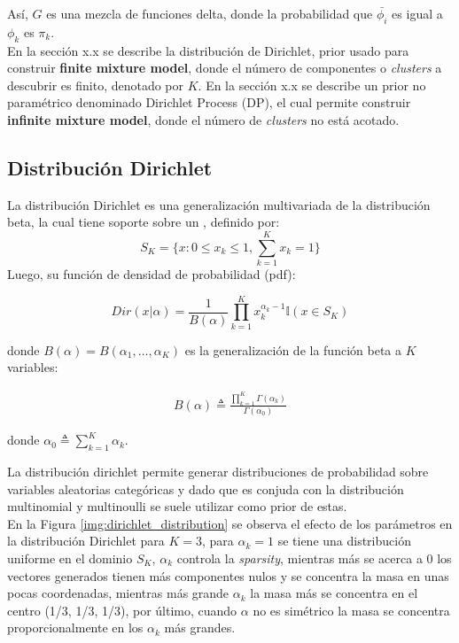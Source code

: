 \documentclass[letterpaper,12pt,oneside]{book} %
\begin{document}
Así, $G$ es una mezcla de funciones delta, donde la probabilidad que $\bar{\phi_{i}}$ es igual a $\phi_{k}$ es $\pi_{k}$.\\

En la sección x.x se describe la distribución de Dirichlet, prior usado para construir \textbf{finite mixture model}, donde el número de componentes o \textit{clusters} a descubrir es finito, denotado por $K$. En la sección x.x se describe un prior no paramétrico denominado Dirichlet Process (DP), el cual permite construir \textbf{infinite mixture model}, donde el número de \textit{clusters} no está acotado. 


\subsection{Distribución Dirichlet}
La distribución Dirichlet es una generalización multivariada de la distribución beta, la cual tiene soporte sobre un , definido por:
\begin{equation}
    S_{K} = \{x: 0\leq x_{k} \leq 1, \sum_{k=1}^{K}x_{k}=1\}
\end{equation}
Luego, su función de densidad de probabilidad (pdf):

\begin{equation}
    Dir(x|\alpha)=\frac{1}{B(\alpha)}\prod_{k=1}^{K}x_{k}^{\alpha_{k}-1}\mathbb{I}(x\in S_{K})
\end{equation}

donde $B(\alpha) = B(\alpha_{1}, \ldots, \alpha_{K})$ es la generalización de la función beta a $K$ variables:

\begin{align}
    B(\alpha) \triangleq \frac{\prod_{k=1}^{K}\Gamma(\alpha_{k})}{\Gamma(\alpha_{0})}
\end{align}

donde $\alpha_{0} \triangleq \sum_{k=1}^{K}\alpha_{k}$.

La distribución dirichlet permite generar distribuciones de probabilidad sobre variables aleatorias categóricas y dado que es conjuda con la distribución multinomial y multinoulli se suele utilizar como prior de estas.\\

En la Figura \ref{img:dirichlet_distribution} se observa el efecto de los parámetros en la distribución Dirichlet para $K=3$, para $\alpha_{k}=1$ se tiene una distribución uniforme en el dominio $S_{K}$, $\alpha_{k}$ controla la \textit{sparsity}, mientras más se acerca a 0 los vectores generados tienen más componentes nulos y se concentra la masa en unas pocas coordenadas, mientras más grande $\alpha_{k}$ la masa más se concentra en el centro (1/3, 1/3, 1/3), por último, cuando $\alpha$ no es simétrico la masa se concentra proporcionalmente en los $\alpha_{k}$ más grandes.\\
\end{document}
